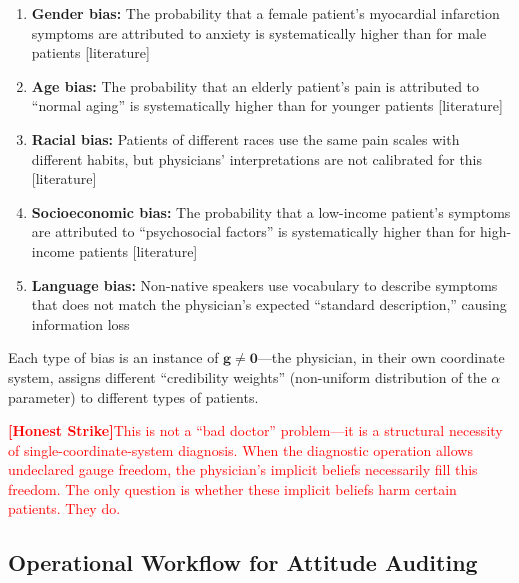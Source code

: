 \documentclass[12pt,a4paper]{article}
\theoremstyle{remark}
\newcommand{\honestcrit}[1]{%
    \textcolor{red}{\textbf{[Honest Strike]}#1}%
}
\begin{document}
\begin{enumerate}[label=(\alph*),itemsep=2pt]
    \item \textbf{Gender bias:} The probability that a female patient's myocardial infarction symptoms are attributed to anxiety is systematically higher than for male patients [literature]
    \item \textbf{Age bias:} The probability that an elderly patient's pain is attributed to ``normal aging'' is systematically higher than for younger patients [literature]
    \item \textbf{Racial bias:} Patients of different races use the same pain scales with different habits, but physicians' interpretations are not calibrated for this [literature]
    \item \textbf{Socioeconomic bias:} The probability that a low-income patient's symptoms are attributed to ``psychosocial factors'' is systematically higher than for high-income patients [literature]
    \item \textbf{Language bias:} Non-native speakers use vocabulary to describe symptoms that does not match the physician's expected ``standard description,'' causing information loss
\end{enumerate}

Each type of bias is an instance of $\mathbf{g} \neq \mathbf{0}$---the physician, in their own coordinate system, assigns different ``credibility weights'' (non-uniform distribution of the $\alpha$ parameter) to different types of patients.

\honestcrit{This is not a ``bad doctor'' problem---it is a structural necessity of single-coordinate-system diagnosis. When the diagnostic operation allows undeclared gauge freedom, the physician's implicit beliefs necessarily fill this freedom. The only question is whether these implicit beliefs harm certain patients. They do.}

\subsection{Operational Workflow for Attitude Auditing}
\end{document}
